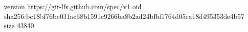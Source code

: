 version https://git-lfs.github.com/spec/v1
oid sha256:bc18bf76bc031ae68b1591c9266ba8b2ad24bfbf1764d05ca18d495353de4b57
size 43840
